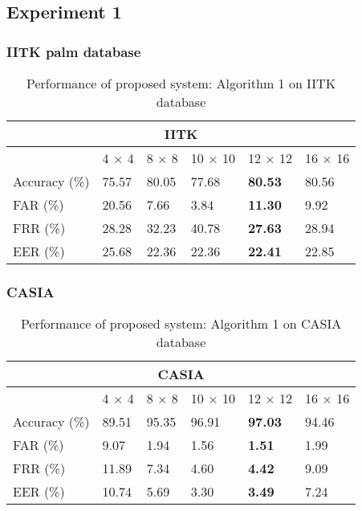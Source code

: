 \documentclass{beamer}
\begin{document}
\subsection{Experiment 1}
\begin{frame}
\frametitle{IITK palm database}
\begin{table}[ht]
\centering
\begin{tabular}{| l || l | l | l | l | l | }
    \hline
    \multicolumn{6}{|c|}{IITK}\\
    \hline
    \hline
		  & 4 $\times$ 4 & 8 $\times$ 8 & 10 $\times$ 10 & 12 $\times$ 12 & 16 $\times$ 16 \\ \hline
    \hline
    Accuracy (\%) & 75.57        & 80.05	& 77.68		 & \textbf{80.53} & 80.56\\ \hline
    FAR (\%) 	  & 20.56        & 7.66		& 3.84 	     	 & \textbf{11.30} & 9.92\\ \hline
    FRR (\%)      & 28.28        & 32.23 	& 40.78 	 & \textbf{27.63} & 28.94\\ \hline
    EER (\%)      & 25.68        & 22.36	& 22.36  	 & \textbf{22.41} & 22.85\\ \hline    
\end{tabular} 
 \caption{Performance of proposed system: Algorithm 1 on IITK database\label{tab:exp1_iitk}}
\end{table}
\end{frame}

\begin{frame}
\frametitle{CASIA}
\begin{table}[ht]
\centering 
\begin{tabular}{| l || l | l | l | l | l | }
    \hline
    \multicolumn{6}{|c|}{CASIA}\\
    \hline
    \hline
		  & 4 $\times$ 4 & 8 $\times$ 8 & 10 $\times$ 10 & 12 $\times$ 12 & 16 $\times$ 16 \\ \hline
    \hline
    Accuracy (\%) & 89.51        & 95.35	& 96.91		 & \textbf{97.03} & 94.46\\ \hline
    FAR (\%) 	  & 9.07        & 1.94		& 1.56 	     	 & \textbf{1.51} & 1.99\\ \hline
    FRR (\%)      & 11.89        & 7.34 	& 4.60 	     	 & \textbf{4.42} & 9.09\\ \hline
    EER (\%)      & 10.74        & 5.69	      	& 3.30  	 &  \textbf{3.49} & 7.24\\ \hline    
\end{tabular}
 \caption{Performance of proposed system: Algorithm 1 on CASIA database\label{table:exp1_casia}}
\end{table}
\end{frame}
\end{document}
